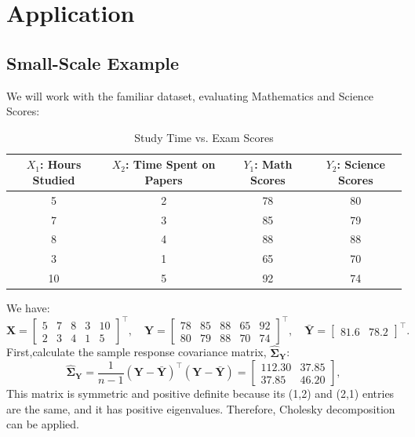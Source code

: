 \documentclass[11pt]{report} %
\begin{document}
\section{Application}

\subsection{Small-Scale Example}
We will work with the familiar dataset, evaluating Mathematics and Science Scores:

\setlength{\tabcolsep}{4pt} %
\begin{table}[H]
    \centering
    \begin{tabular}{|c|c|c|c|}
        \hline
        \( X_1 \): Hours Studied & \( X_2 \): Time Spent on Papers & \( Y_1 \): Math Scores & \( Y_2 \): Science Scores\\
        \hline
        5  & 2  & 78 & 80 \\
        7  & 3  & 85 & 79 \\
        8  & 4  & 88 & 88 \\
        3  & 1  & 65 & 70 \\
        10 & 5  & 92 & 74 \\
        \hline
    \end{tabular}
    \caption{Study Time vs. Exam Scores}
    \label{tab:study_scores6}
\end{table}
\noindent We have:
\[
\mathbf{X} =
\begin{bmatrix}
5 & 7 & 8 & 3 & 10 \\
2 & 3 & 4 & 1 & 5
\end{bmatrix}^{\top},
\quad
\mathbf{Y} =
\begin{bmatrix}
78 & 85 & 88 & 65 & 92 \\
80 & 79 & 88 & 70 & 74
\end{bmatrix}^{\top},
\quad
\mathbf{\bar{Y}} = \begin{bmatrix}
  81.6  & 78.2
\end{bmatrix}^\top.
\]
First,calculate the sample response covariance matrix, $\mathbf{\hat{\Sigma}_Y}$:
\[
\mathbf{\hat{\Sigma}_Y} = \frac{1}{n-1} (\mathbf{Y} - \bar{\mathbf{Y}})^{\top} (\mathbf{Y} - \bar{\mathbf{Y}})=
\begin{bmatrix}
    112.30 & 37.85 \\
    37.85 & 46.20
\end{bmatrix},
\]
This matrix is symmetric and positive definite because its (1,2) and (2,1) entries are the same, and it has positive eigenvalues. Therefore, Cholesky decomposition can be applied.
\end{document}
